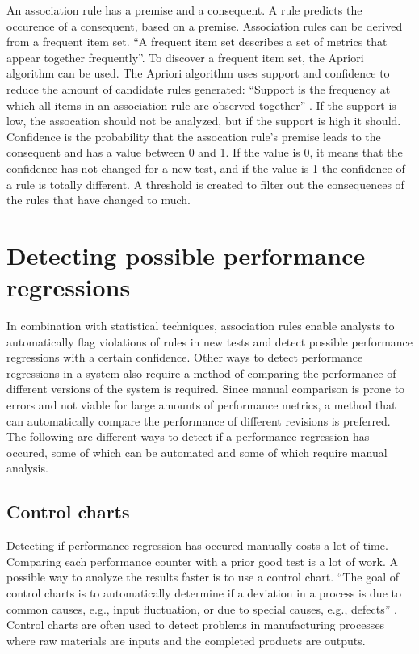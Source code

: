 An association rule has a premise and a consequent. A rule predicts the occurence of a consequent, based on a premise. Association rules can be derived from a frequent item set. ``A frequent item set describes a set of metrics that appear together frequently''\cite{foo2010mining}. To discover a frequent item set, the Apriori algorithm can be used. The Apriori algorithm uses support and confidence to reduce the amount of candidate rules generated:
``Support is the frequency at which all items in an association rule are observed together'' \cite{foo2010mining}. If the support is low, the assocation should not be analyzed, but if the support is high it should. Confidence is the probability that the assocation rule's premise leads to the consequent and has a value between 0 and 1. If the value is 0, it means that the confidence has not changed for a new test, and if the value is 1 the confidence of a rule is totally different. A threshold is created to filter out the consequences of the rules that have changed to much.

\section{Detecting possible performance regressions}
In combination with statistical techniques, association rules enable analysts to automatically flag violations of rules in new tests and detect possible performance regressions with a certain confidence. Other ways to detect performance regressions in a system also require a method of comparing the performance of different versions of the system is required. Since manual comparison is prone to errors and not viable for large amounts of performance metrics, a method that can automatically compare the performance of different revisions is preferred. The following are different ways to detect if a performance regression has occured, some of which can be automated and some of which require manual analysis.

\subsection{Control charts}
Detecting if performance regression has occured manually costs a lot of time. Comparing each performance counter with a prior good test is a lot of work. A possible way to analyze the results faster is to use a control chart.
``The goal of control charts is to automatically determine if a deviation in a process is due to common causes, e.g., input fluctuation, or due to special causes, e.g., defects'' \cite{nguyen2012using}. Control charts are often used to detect problems in manufacturing processes where raw materials are inputs and the completed products are outputs. %

